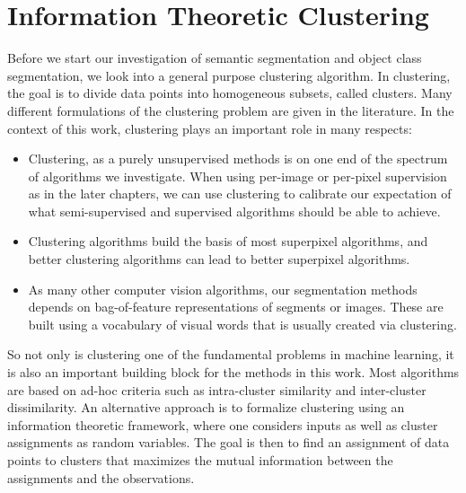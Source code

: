 \chapter{Information Theoretic Clustering}\label{ch:itm}

Before we start our investigation of semantic segmentation and object class segmentation,
we look into a general purpose clustering algorithm.
%
In clustering, the goal is to divide data points into homogeneous subsets, called
clusters.
Many different formulations of the clustering problem are given in the literature.
%
In the context of this work, clustering plays an important role in many respects:
\begin{itemize}
    \item Clustering, as a purely unsupervised methods is on one end of the
        spectrum of algorithms we investigate.  When using per-image or
        per-pixel supervision as in the later chapters, we can use clustering
        to calibrate our expectation of what semi-supervised and supervised
        algorithms should be able to achieve.

    \item Clustering algorithms build the basis of most superpixel algorithms, and
        better clustering algorithms can lead to better superpixel algorithms.

    \item As many other computer vision algorithms, our segmentation methods
        depends on bag-of-feature representations of segments or images. These
        are built using a vocabulary of visual words that is usually created
        via clustering.
\end{itemize}

So not only is clustering one of the fundamental problems in machine learning, it is also
an important building block for the methods in this work.
%
Most algorithms are based on ad-hoc criteria such as intra-cluster similarity
and inter-cluster dissimilarity.
An alternative approach is to formalize clustering using an information
theoretic framework, where one considers inputs as well as cluster assignments
as random variables.  The goal is then to find an assignment of data points to
clusters that maximizes the mutual information between the assignments and the
observations.

